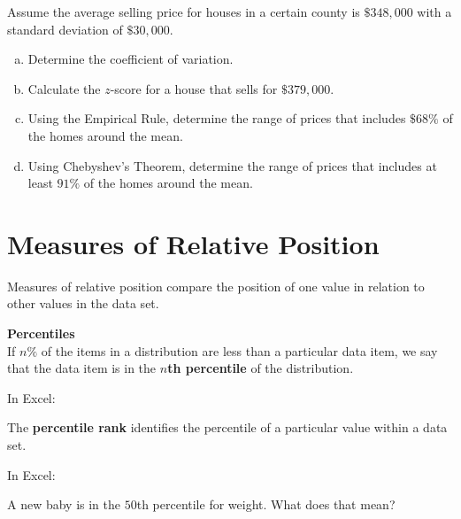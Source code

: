 \documentclass[12pt, letterpaper]{article}
\newcounter{exercise}
\theoremstyle{definition}
\begin{document}
\begin{exercise}
Assume the average selling price for houses in a certain county is $\$348,000$ with a standard deviation of $\$30,000$.
\begin{enumerate}[(a)]
\item Determine the coefficient of variation.
\vfill
\item Calculate the $z$-score for a house that sells for $\$379,000$.
\vfill
\item Using the Empirical Rule, determine the range of prices that includes $\$68\%$ of the homes around the mean.
\vfill
\vfill
\item Using Chebyshev's Theorem, determine the range of prices that includes at least $91\%$ of the homes around the mean.
\vfill
\vfill
\vfill
\end{enumerate}
\end{exercise}


\newpage

\section*{Measures of Relative Position}

Measures of relative position compare the position of one value in relation to other values in the data set.

\begin{defn}
\textbf{Percentiles}\\
If $n\%$ of the items in a distribution are less than a particular data item, we say that the data item is in the \textbf{$n$th percentile} of the distribution.

\vspace*{.2in}
In Excel:
\vspace*{.2in}
\end{defn}



\begin{defn}
The \textbf{percentile rank} identifies the percentile of a particular value within a data set.

\vspace*{.2in}
In Excel:
\vspace*{.2in}
\end{defn}

\begin{exercise} A new baby is in the $50$th percentile for weight.  What does that mean?
\end{exercise}

\vfill
\end{document}
